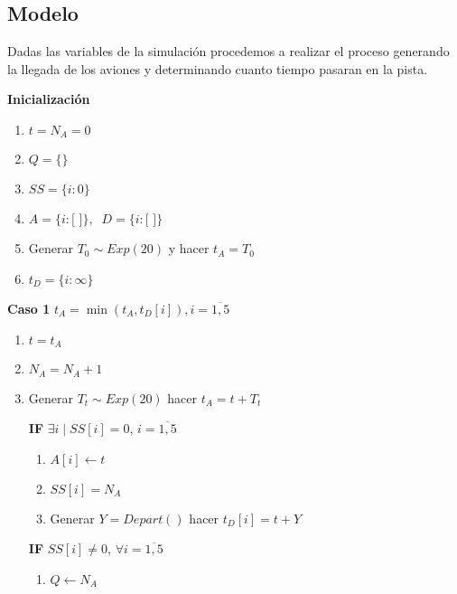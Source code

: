 \documentclass[a4paper,10pt,twocolumn]{article}
\begin{document}
	\subsection{Modelo}\label{sub:figures}
		
		Dadas las variables de la simulaci\'on procedemos a realizar el proceso generando la llegada de los aviones y determinando cuanto tiempo pasaran en la pista.
		
		\newpage
		
		\textbf{Inicializaci\'on}
		\begin{enumerate}
			\item[] $t = N_{A} = 0$
			\item[] $Q = \{\}$
			\item[] $SS = \{i: 0\}$
			\item[] $A = \{i: \text{[ ]}\}, \;\; D = \{i: \text{[ ]}\}$
			\item[] Generar $T_{0} \sim Exp(20)$ y hacer $t_{A} = T_{0}$
			\item[] $t_{D} = \{i: \infty\}$
		\end{enumerate}

		\textbf{Caso 1} $ t_{A} = \min{( t_{A}, t_{D}[i] )}, i = \overline{1,5}$
		
		\begin{enumerate}
			\item[] $t = t_{A}$
			\item[] $N_{A} = N_{A} + 1$
			\item[] Generar $T_{t} \sim Exp(20)$ hacer $t_{A} = t + T_{t}$
			
			\textbf{IF} $\exists i \; | \; SS[i] = 0$, $i = \overline{1,5}$
				\begin{enumerate}
					\item[] $A[i] \leftarrow t$
					\item[] $SS[i] = N_{A}$
					\item[] Generar $Y = Depart()$ hacer $t_{D}[i] = t + Y$ 
				\end{enumerate}
			
			\textbf{IF} $SS[i] \neq 0$, $\forall i = \overline{1,5}$
			\begin{enumerate}
				\item[] $Q \leftarrow N_{A}$ 
			\end{enumerate}
		\end{enumerate}
	
\end{document}

